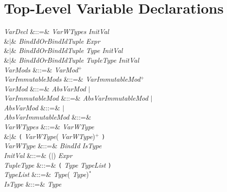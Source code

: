 \section{Top-Level Variable Declarations}
\begin{Grammar}
\emph{VarDecl}
&::=&  \emph{VarWTypes} \emph{InitVal} \\
&$|$&  \emph{BindIdOrBindIdTuple} \EXP{=} \emph{Expr}\\
&$|$&  \emph{BindIdOrBindIdTuple} \EXP{\mathrel{\mathtt{:}}} \emph{Type}
\emph{InitVal} \\
&$|$&  \emph{BindIdOrBindIdTuple} \EXP{\mathrel{\mathtt{:}}} \emph{TupleType}
\emph{InitVal} \\

\emph{VarMods} &::=& \emph{VarMod}$^+$\\

\emph{VarImmutableMods} &::=& \emph{VarImmutableMod}$^+$\\

\emph{VarMod} &::=& \emph{AbsVarMod} $|$ \\

\emph{VarImmutableMod} &::=& \emph{AbsVarImmutableMod} $|$ \\

\emph{AbsVarMod} &::=&  $|$ \\

\emph{AbsVarImmutableMod} &::=& \\

\emph{VarWTypes} &::=& \emph{VarWType} \\
&$|$& \texttt{(} \emph{VarWType}(\EXP{,} \emph{VarWType})$^+$ \texttt{)}\\

\emph{VarWType} &::=& \emph{BindId} \emph{IsType}\\

\emph{InitVal} &::=& (\EXP{=}$|$\EXP{\ASSIGN}) \emph{Expr} \\

\emph{TupleType} &::=&
\texttt{(} \emph{Type}\EXP{,} \emph{TypeList} \texttt{)}\\

\emph{TypeList} &::=& \emph{Type}(\EXP{,} \emph{Type})$^*$ \\

\emph{IsType} &::=& \EXP{\mathrel{\mathtt{:}}} \emph{Type}\\
\end{Grammar}

